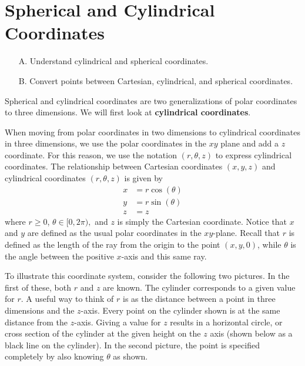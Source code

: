 \section{Spherical and Cylindrical Coordinates}

\begin{outcome}
\begin{enumerate}
\item[A.]  Understand cylindrical and spherical coordinates.

\item[B.]  Convert points between Cartesian, cylindrical, and spherical coordinates.
\end{enumerate}
\end{outcome}

Spherical and cylindrical coordinates are two generalizations of polar coordinates to three dimensions. We will first look at \textbf{cylindrical coordinates}.

When moving from polar coordinates in two dimensions to cylindrical coordinates in three dimensions, we use the polar coordinates in the $xy$
plane and add a $z$ coordinate. For this reason, we use the notation $(r, \theta, z)$ to express cylindrical coordinates.
The relationship between Cartesian coordinates $(x,y,z)$ and cylindrical coordinates $(r, \theta, z)$ is given by  
\begin{align*}
x& =r\cos \left( \theta \right)  \\
y& =r\sin \left( \theta \right)  \\
z& =z
\end{align*}
where $r\geq 0$, $\theta \in \lbrack 0,2\pi ),$ and $z$ is simply the Cartesian
coordinate. Notice that $x$ and $y$ are defined as the usual polar coordinates in the $xy$-plane. Recall that $r$ is defined as the length of the ray from the origin to the point $(x,y,0)$, while $\theta$ is the angle between the positive $x$-axis and this same ray. 

To illustrate this coordinate system, consider the following two pictures.
In the first of these, both $r$ and $z$ are known. The cylinder corresponds to a given value for $r$. A useful way to think of $r$ is
as the distance between a point in three dimensions and the $z$-axis. Every point on the cylinder shown is at the same distance from the $z$-axis. Giving a value for $z$ results in a horizontal circle, or cross section of the cylinder at the given height on the $z$ axis (shown below as a black line on the cylinder). In the second picture, the point is specified completely by also knowing $\theta$ as shown.

